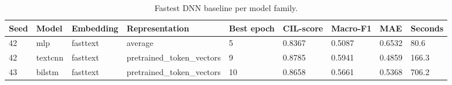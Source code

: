 \begin{table}[htbp]
\centering
\caption{Fastest DNN baseline per model family.}
\label{tab:dnn-fastest-families}
\begin{tabular}{lllllllll}
\toprule
Seed & Model & Embedding & Representation & Best epoch & CIL-score & Macro-F1 & MAE & Seconds \\
\midrule
42 & mlp & fasttext & average & 5 & 0.8367 & 0.5087 & 0.6532 & 80.6 \\
42 & textcnn & fasttext & pretrained\_token\_vectors & 9 & 0.8785 & 0.5941 & 0.4859 & 166.3 \\
43 & bilstm & fasttext & pretrained\_token\_vectors & 10 & 0.8658 & 0.5661 & 0.5368 & 706.2 \\
\bottomrule
\end{tabular}
\end{table}
